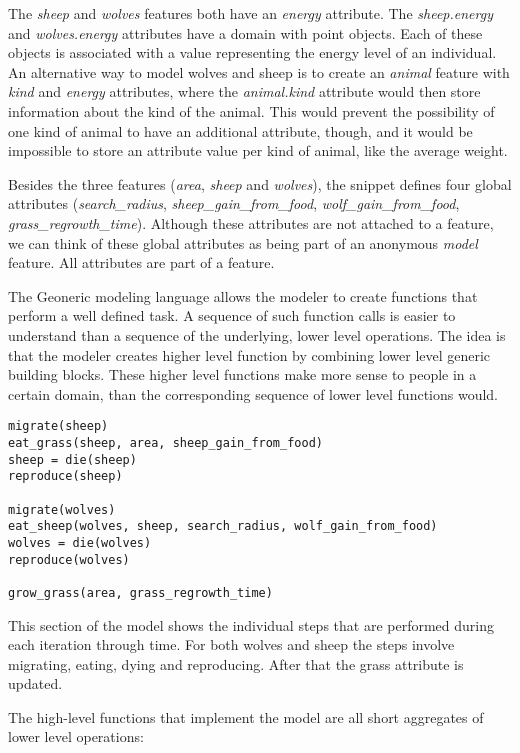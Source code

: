 \documentclass[10pt, a4paper]{article}
\begin{document}
The \emph{sheep} and \emph{wolves} features both have an \emph{energy} attribute. The \emph{sheep.energy} and \emph{wolves.energy} attributes have a domain with point objects. Each of these objects is associated with a value representing the energy level of an individual. An alternative way to model wolves and sheep is to create an \emph{animal} feature with \emph{kind} and \emph{energy} attributes, where the \emph{animal.kind} attribute would then store information about the kind of the animal. This would prevent the possibility of one kind of animal to have an additional attribute, though, and it would be impossible to store an attribute value per kind of animal, like the average weight.

Besides the three features (\emph{area}, \emph{sheep} and \emph{wolves}), the snippet defines four global attributes (\emph{search\_radius}, \emph{sheep\_gain\_from\_food}, \emph{wolf\_gain\_from\_food}, \emph{grass\_regrowth\_time}). Although these attributes are not attached to a feature, we can think of these global attributes as being part of an anonymous \emph{model} feature. All attributes are part of a feature.


The Geoneric modeling language allows the modeler to create functions that perform a well defined task. A sequence of such function calls is easier to understand than a sequence of the underlying, lower level operations. The idea is that the modeler creates higher level function by combining lower level generic building blocks. These higher level functions make more sense to people in a certain domain, than the corresponding sequence of lower level functions would.

\begin{lstlisting}
migrate(sheep)
eat_grass(sheep, area, sheep_gain_from_food)
sheep = die(sheep)
reproduce(sheep)

migrate(wolves)
eat_sheep(wolves, sheep, search_radius, wolf_gain_from_food)
wolves = die(wolves)
reproduce(wolves)

grow_grass(area, grass_regrowth_time)
\end{lstlisting}

This section of the model shows the individual steps that are performed during each iteration through time. For both wolves and sheep the steps involve migrating, eating, dying and reproducing. After that the grass attribute is updated.

The high-level functions that implement the model are all short aggregates of lower level operations:
\end{document}
